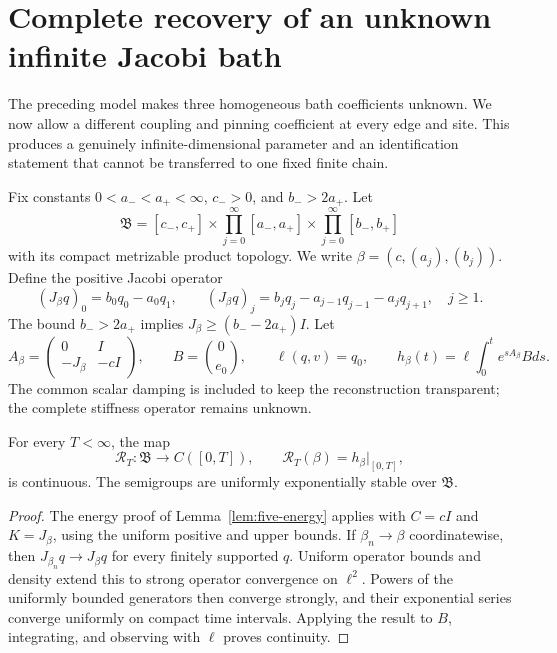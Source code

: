
\section{Complete recovery of an unknown infinite Jacobi bath}
\label{sec:infinite-jacobi}

The preceding model makes three homogeneous bath coefficients unknown.  We
now allow a different coupling and pinning coefficient at every edge and
site.  This produces a genuinely infinite-dimensional parameter and an
identification statement that cannot be transferred to one fixed finite
chain.

Fix constants \(0<a_-<a_+<\infty\), \(c_->0\), and
\(b_->2a_+\).  Let
\begin{equation}
 \mathfrak B=[c_-,c_+]
 \times\prod_{j=0}^\infty[a_-,a_+]
 \times\prod_{j=0}^\infty[b_-,b_+]
 \label{eq:jacobi-parameter}
\end{equation}
with its compact metrizable product topology.  We write
\(\beta=(c,(a_j),(b_j))\).  Define the positive Jacobi operator
\begin{equation}
 (J_\beta q)_0=b_0q_0-a_0q_1,
 \qquad
 (J_\beta q)_j=b_jq_j-a_{j-1}q_{j-1}-a_jq_{j+1},\quad j\ge1.
 \label{eq:jacobi-operator}
\end{equation}
The bound \(b_->2a_+\) implies
\(J_\beta\ge(b_--2a_+)I\).  Let
\[
 A_\beta=\begin{pmatrix}0&I\\-J_\beta&-cI\end{pmatrix},
 \qquad B=\binom0{e_0},\qquad\ell(q,v)=q_0,
 \qquad h_\beta(t)=\ell\int_0^te^{sA_\beta}Bds.
\]
The common scalar damping is included to keep the reconstruction transparent;
the complete stiffness operator remains unknown.

\begin{lemma}
\label{lem:product-continuity}
For every \(T<\infty\), the map
\[
 \mathcal R_T:\mathfrak B\to C([0,T]),
 \qquad \mathcal R_T(\beta)=h_\beta|_{[0,T]},
\]
is continuous.  The semigroups are uniformly exponentially stable over
\(\mathfrak B\).
\end{lemma}

\begin{proof}
The energy proof of Lemma~\ref{lem:five-energy} applies with
\(C=cI\) and \(K=J_\beta\), using the uniform positive and upper bounds.
If \(\beta_n\to\beta\) coordinatewise, then
\(J_{\beta_n}q\to J_\beta q\) for every finitely supported \(q\).  Uniform
operator bounds and density extend this to strong operator convergence on
\(\ell^2\).  Powers of the uniformly bounded generators then converge
strongly, and their exponential series converge uniformly on compact time
intervals.  Applying the result to \(B\), integrating, and observing with
\(\ell\) proves continuity.
\end{proof}


